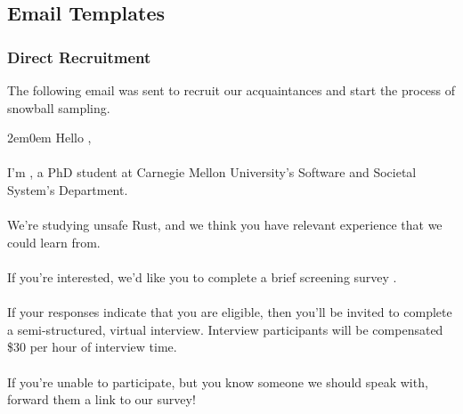 \subsection{Email Templates}

\subsubsection{Direct Recruitment}
The following email was sent to recruit our acquaintances and start the process of snowball sampling.
\\
\begin{adjustwidth}{2em}{0em}
\noindent Hello ,
\\\\
\noindent I’m , a PhD student at Carnegie Mellon University’s Software and Societal
System’s Department.
\\\\
\noindent We’re studying unsafe Rust, and we think you have relevant experience that we could learn
from.
\\\\
\noindent If you’re interested, we’d like you to complete a brief screening survey .
\\\\
\noindent If your responses indicate that you are eligible, then you’ll be invited to complete a
semi-structured, virtual interview. Interview participants will be compensated \$30 per hour of
interview time.
\\\\
\noindent If you’re unable to participate, but you know someone we should speak with, forward them a link
to our survey!
\end{adjustwidth}

